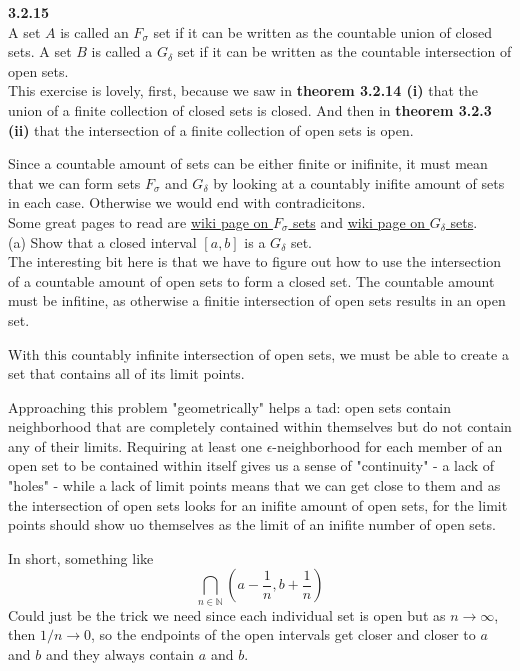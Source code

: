 \textbf{3.2.15}
\\

A set $A$ is called an $F_\sigma$ set if it can be written as the countable union of closed sets.
A set $B$ is called a $G_\delta$ set if it can be written as the countable intersection of open sets.
\\

This exercise is lovely, first, because we saw in \textbf{theorem 3.2.14 (i)} that the union of a
finite collection of closed sets is closed.
And then in \textbf{theorem 3.2.3 (ii)} that the intersection of a finite collection of open sets is open.

Since a countable amount of sets can be either finite or inifinite, it must mean that we can form
sets $F_\sigma$ and $G_\delta$ by looking at a countably inifite amount of sets in each case.
Otherwise we would end with contradicitons.
\\

Some great pages to read are \href{https://en.wikipedia.org/wiki/F%CF%83_set}{wiki page on $F_\sigma$ sets}
and \href{https://en.wikipedia.org/wiki/G%CE%B4_set}{wiki page on $G_\delta$ sets}.
\\


(a) Show that a closed interval $[a,b]$ is a $G_\delta$ set.
\\

The interesting bit here is that we have to figure out how to use the intersection of a countable amount
of open sets to form a closed set.
The countable amount must be infitine, as otherwise a finitie intersection of open sets results in an open set.

With this countably infinite intersection of open sets, we must be able to create a set that contains all of its
limit points.

Approaching this problem "geometrically" helps a tad: open sets contain neighborhood that are completely contained within
themselves but do not contain any of their limits.
Requiring at least one $\epsilon$-neighborhood for each member of an open set to be contained within itself
gives us a sense of "continuity" - a lack of "holes" - while a lack of limit points means that we can get close
to them and as the intersection of open sets looks for an inifite amount of open sets, for the limit points should
show uo themselves as the limit of an inifite number of open sets.

In short, something like
$$
\bigcap_{n\in\mathbb{N}} \left( a-\frac{1}{n}, b+\frac{1}{n} \right)
$$
Could just be the trick we need since each individual set is open but as $n\rightarrow\infty$,
then $1/n \rightarrow 0$, so the endpoints of the open intervals get closer and closer to $a$ and $b$
and they always contain $a$ and $b$.
\\~\\


